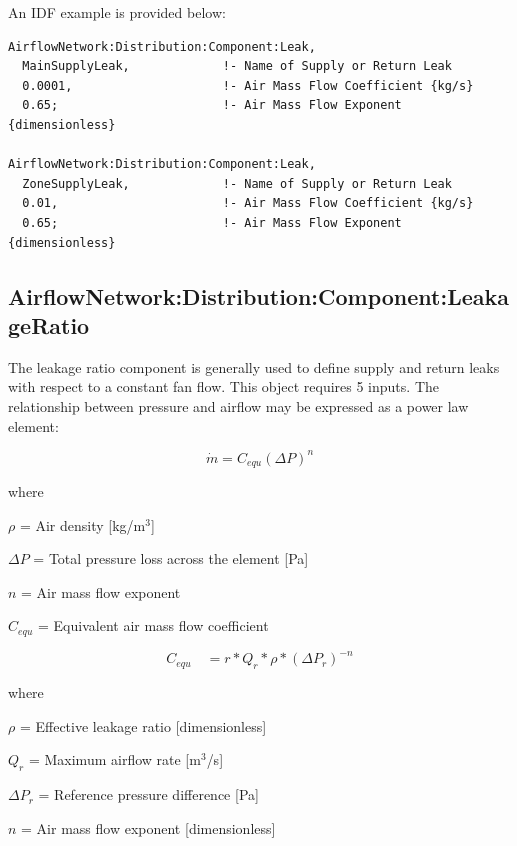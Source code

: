 An IDF example is provided below:

\begin{lstlisting}
AirflowNetwork:Distribution:Component:Leak,
  MainSupplyLeak,             !- Name of Supply or Return Leak
  0.0001,                     !- Air Mass Flow Coefficient {kg/s}
  0.65;                       !- Air Mass Flow Exponent {dimensionless}

AirflowNetwork:Distribution:Component:Leak,
  ZoneSupplyLeak,             !- Name of Supply or Return Leak
  0.01,                       !- Air Mass Flow Coefficient {kg/s}
  0.65;                       !- Air Mass Flow Exponent {dimensionless}
\end{lstlisting}

\subsection{AirflowNetwork:Distribution:Component:LeakageRatio}\label{airflownetworkdistributioncomponentleakageratio}

The leakage ratio component is generally used to define supply and return leaks with respect to a constant fan flow. This object requires 5 inputs. The relationship between pressure and airflow may be expressed as a power law element:

\begin{equation}
\dot m = {C_{equ}}{\left( {\Delta P} \right)^n}
\end{equation}

where

\(\rho\) = Air density {[}kg/m\(^{3}\){]}

\(\Delta P\) = Total pressure loss across the element {[}Pa{]}

\(n\) = Air mass flow exponent

\(C_{equ}\) = Equivalent air mass flow coefficient

\begin{equation}
{C_{equ}}\,\,\,\,\,\, = r*{Q_r}*\rho *{\left( {\Delta {P_r}} \right)^{ - n}}
\end{equation}

where

\(\rho\) = Effective leakage ratio {[}dimensionless{]}

\(Q_{r}\) = Maximum airflow rate {[}m\(^{3}\)/s{]}

\(\Delta {P_r}\) = Reference pressure difference {[}Pa{]}

\(n\) = Air mass flow exponent {[}dimensionless{]}

